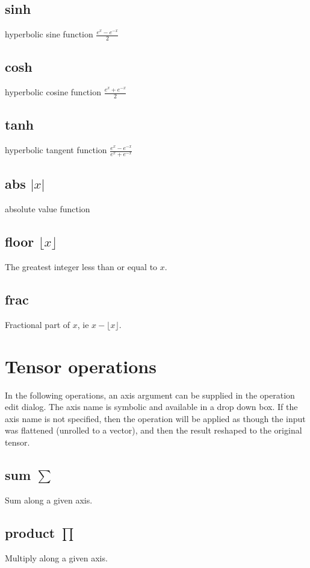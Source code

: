 \subsection{sinh}\label{Operation:sinh} hyperbolic sine function $\frac{e^x-e^{-x}}2$
\subsection{cosh}\label{Operation:cosh} hyperbolic cosine function $\frac{e^x+e^{-x}}2$
\subsection{tanh}\label{Operation:tanh} hyperbolic tangent function $\frac{e^x-e^{-x}}{e^x+e^{-x}}$
\subsection{abs $|x|$}\label{Operation:abs} absolute value function
\subsection{floor $\lfloor x\rfloor$}\label{Operation:floor} The greatest integer
  less than or equal to $x$.
\subsection{frac}\label{Operation:frac} Fractional part of $x$, ie $x-\lfloor x\rfloor$. 

\section{Tensor operations}\label{tensor operations}

In the following operations, an axis argument can be supplied in the
operation edit dialog. The axis name is symbolic and available in a
drop down box. If the axis name is not specified, then the operation
will be applied as though the input was flattened (unrolled to a
vector), and then the result reshaped to the original tensor.

\subsection{sum $\sum$}\label{Operation:sum} Sum along a given
axis. 

\subsection{product $\prod$}\label{Operation:product} Multiply along a given axis. 

